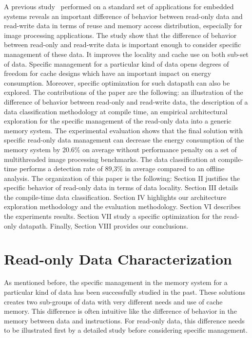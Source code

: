 \documentclass[sigconf]{acmart}
\begin{document}
A previous study~\cite{vaumourin:2014} performed on a standard set of applications for embedded systems reveals an important difference of behavior between read-only data and read-write data in terms of reuse and memory access distribution, especially for image processing applications. The study show that the difference of behavior between read-only and read-write data is important enough to consider specific management of these data. It improves the locality and cache use on both sub-set of data. Specific management for a particular kind of data opens degrees of freedom for cache designs which have an important impact on energy consumption. Moreover, specific optimization for such datapath can also be explored. The contributions of the paper are the following: an illustration of the difference of behavior between read-only and read-write data, the description of a data classification methodology at compile time, an empirical architectural exploration for the specific management of the read-only data into a generic memory system. The experimental evaluation shows that the final solution with specific read-only data management can decrease the energy consumption of the memory system by 20.6\% on average without performance penalty on a set of multithreaded image processing benchmarks. The data classification at compile-time performs a detection rate of 89,3\% in average compared to an offline analysis. The organization of this paper is the following: Section II justifies the specific behavior of read-only data in terms of data locality. Section III details the compile-time data classification. Section IV highlights our architecture exploration methodology and the evaluation methodology. Section VI describes the experiments results. Section VII study a specific optimization for the read-only datapath. Finally, Section VIII provides our conclusions.


\section{Read-only Data Characterization}

As mentioned before, the specific management in the memory system for a particular kind of data has been successfully studied in the past. These solutions creates two sub-groups of data with very different needs and use of cache memory. This difference is often intuitive like the difference of behavior in the memory between data and instructions. For read-only data, this difference needs to be illustrated first by a detailed study before considering specific management.  
\end{document}
